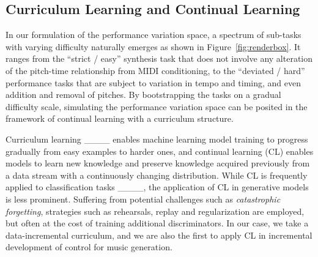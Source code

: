 \subsection{Curriculum Learning and Continual Learning}

In our formulation of the performance variation space, a spectrum of sub-tasks with varying difficulty naturally emerges as shown in Figure~\ref{fig:renderbox}. It ranges from the ``strict / easy'' synthesis task that does not involve any alteration of the pitch-time relationship from MIDI conditioning, to the ``deviated / hard'' performance tasks that are subject to variation in tempo and timing, and even addition and removal of pitches.  By bootstrapping the tasks on a gradual difficulty scale, simulating the performance variation space can be posited in the framework of continual learning with a curriculum structure. 

Curriculum learning ____ enables machine learning model training to progress gradually from easy examples to harder ones, and continual learning (CL) 
enables models to learn new knowledge and preserve knowledge acquired previously from a data stream with a continuously changing distribution.  
While CL is frequently applied to classification tasks ____, the application of CL in generative models 
is less prominent. Suffering from potential challenges such as \textit{catastrophic forgetting}, strategies such as rehearsals, replay and regularization are employed, but often at the cost of training additional discriminators. In our case, we take a data-incremental curriculum, and we are also the first to apply CL in incremental development of control for music generation.